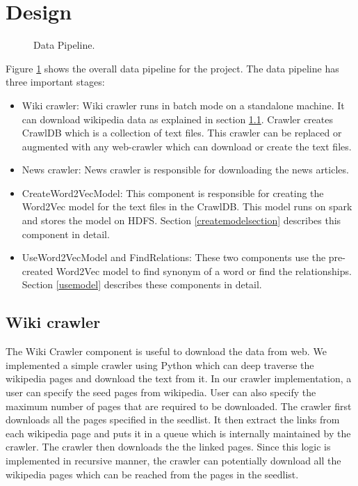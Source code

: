 \section{Design} \label{designsection}

\begin{figure}[htbp]
\centering
{}
\caption{Data Pipeline.}
\label{fig:datapipeline}
\end{figure}

Figure \ref{fig:datapipeline} shows the overall data pipeline for the
project. The data pipeline has three important stages:
\begin{itemize}
\item Wiki crawler: Wiki crawler runs in batch mode on a standalone machine. It
 can download wikipedia data as explained in section \ref{wikicrawlersection}.
 Crawler creates CrawlDB which is a collection of text files. This crawler
 can be replaced or augmented with any web-crawler which can download or
 create the text files.

 \item News crawler: News crawler is responsible for downloading the news
 articles.

\item CreateWord2VecModel: This component is responsible for creating the
Word2Vec model for the text files in the CrawlDB. This model runs on spark
and stores the model on HDFS. Section \ref{createmodelsection} describes this
 component in detail.

\item UseWord2VecModel and FindRelations: These two components use the
pre-created Word2Vec model to find synonym of a word or find the relationships.
Section \ref{usemodel} describes these components in detail.
\end{itemize}

\subsection{Wiki crawler} \label{wikicrawlersection}
The Wiki Crawler component is useful to download the data from web. We
implemented
 a simple crawler using Python which can deep traverse the wikipedia pages
 and download the text from it. In our crawler implementation, a user can
 specify the seed pages from wikipedia. User can also specify the maximum
 number of pages that are required to be downloaded. The crawler first
 downloads all the pages specified in the seedlist. It then extract the links
  from each wikipedia page and puts it in a queue which is internally
  maintained by the crawler. The crawler then downloads the the linked pages.
   Since this logic is implemented in recursive manner, the crawler can
   potentially download all the wikipedia pages which can be reached from the
   pages in the seedlist.

